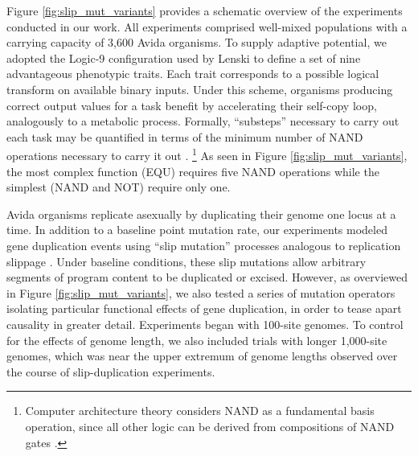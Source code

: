 Figure \ref{fig:slip_mut_variants} provides a schematic overview of the experiments conducted in our work.
All experiments comprised well-mixed populations with a carrying capacity of 3,600 Avida organisms.
To supply adaptive potential, we adopted the Logic-9 configuration used by Lenski \citet{lenski2003evolutionary} to define a set of nine advantageous phenotypic traits.
Each trait corresponds to a possible logical transform on available binary inputs.
Under this scheme, organisms producing correct output values for a task benefit by accelerating their self-copy loop, analogously to a metabolic process.
Formally, ``substeps'' necessary to carry out each task may be quantified in terms of the minimum number of NAND operations necessary to carry it out \citep{lenski2003evolutionary}.%
\footnote{
Computer architecture theory considers NAND as a fundamental basis operation, since all other logic can be derived from compositions of NAND gates \citep{mano1997logic}.
}
As seen in Figure \ref{fig:slip_mut_variants}, the most complex function (EQU) requires five NAND operations while the simplest (NAND and NOT) require only one.

Avida organisms replicate asexually by duplicating their genome one locus at a time.
In addition to a baseline point mutation rate, our experiments
modeled gene duplication events using ``slip mutation'' processes analogous to replication slippage \citep{bzymek_instability_2001}.
Under baseline conditions, these slip mutations allow arbitrary segments of program content to be duplicated or excised.
However, as overviewed in Figure \ref{fig:slip_mut_variants}, we also tested a series of mutation operators isolating particular functional effects of gene duplication, in order to tease apart causality in greater detail.
Experiments began with 100-site genomes.
To control for the effects of genome length, we also included trials with longer 1,000-site genomes, which was near the upper extremum of genome lengths observed over the course of slip-duplication experiments.

